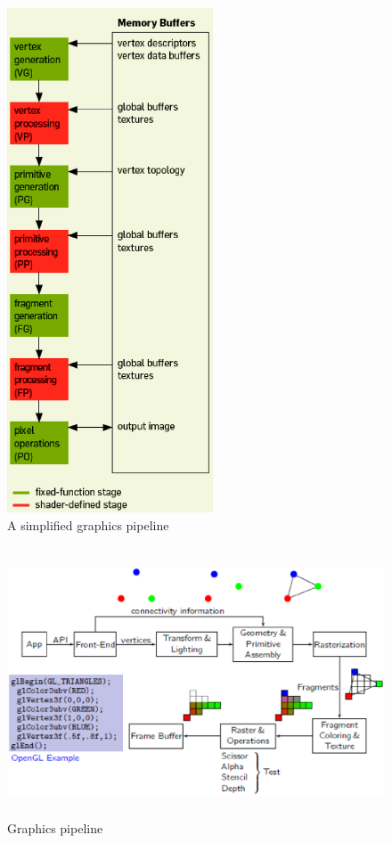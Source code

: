 \begin{figure}
\begin{minipage}[b]{0.5\linewidth}
  \end{minipage}
  \begin{minipage}[b]{0.5\linewidth}
    \centerline{\includegraphics[height=15cm,
      angle=0]{./images/pipeline.eps}}
    \caption{A simplified graphics pipeline}
    \label{fig:graph_pipeline2}
  \end{minipage}
\end{figure}



\begin{figure}[hbt]
  \centerline{\includegraphics[height=8cm,
    angle=0]{./images/graphics_pipeline.eps}}
  \caption{Graphics pipeline}
  \label{fig:graph_pipeline}
\end{figure}




